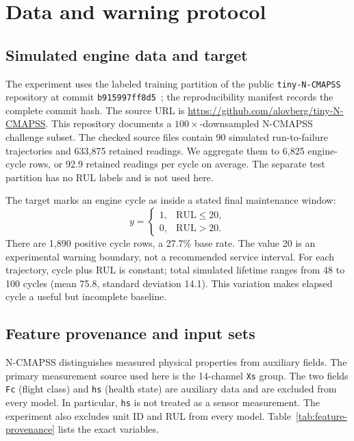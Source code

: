 \section{Data and warning protocol}
\label{sec:methods}

\subsection{Simulated engine data and target}

The experiment uses the labeled training partition of the public
\texttt{tiny-N-CMAPSS} repository at commit
\texttt{b915997ff8d5}~\cite{tiny_ncmapss}; the reproducibility manifest records
the complete commit hash.
The source URL is \url{https://github.com/alovberg/tiny-N-CMAPSS}.
This repository documents a $100\times$-downsampled N-CMAPSS challenge subset.
The checked source files contain 90 simulated run-to-failure trajectories and
633,875 retained readings. We aggregate them to 6,825 engine-cycle rows, or
92.9 retained readings per cycle on average. The separate test partition has
no RUL labels and is not used here.

The target marks an engine cycle as inside a stated final maintenance window:
\begin{equation}
y=\begin{cases}
1, & \mathrm{RUL}\leq20,\\
0, & \mathrm{RUL}>20.
\end{cases}
\label{eq:maintenance-window}
\end{equation}
There are 1,890 positive cycle rows, a 27.7\% base rate. The value 20 is an
experimental warning boundary, not a recommended service interval. For each
trajectory, cycle plus RUL is constant; total simulated lifetime ranges from
48 to 100 cycles (mean 75.8, standard deviation 14.1). This variation makes
elapsed cycle a useful but incomplete baseline.

\subsection{Feature provenance and input sets}

N-CMAPSS distinguishes measured physical properties from auxiliary fields.
The primary measurement source used here is the 14-channel \texttt{Xs} group.
The two fields \texttt{Fc} (flight class) and \texttt{hs} (health state) are
auxiliary data and are excluded from every model. In particular, \texttt{hs}
is not treated as a sensor measurement. The experiment also excludes unit ID
and RUL from every model. Table~\ref{tab:feature-provenance} lists the exact
variables.


